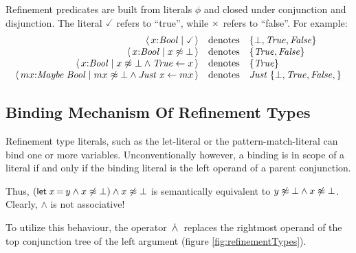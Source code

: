 Refinement predicates are built from literals $\phi$ and closed under conjunction and disjunction.
The literal $\true$ refers to ``true'', while $\times$ refers to ``false''. For example:
$$
	\begin{array}{rcl}
		\reft{ x{:}\ensuremath{\Conid{Bool}}}{ \true }                                                                                                           & \text{denotes} & \{ \bot, \ensuremath{\Conid{True}}, \ensuremath{\Conid{False}} \}                       \\
		\reft{ x{:}\ensuremath{\Conid{Bool}}}{ x \ntermeq \bot }                                                                                                 & \text{denotes} & \{ \ensuremath{\Conid{True}}, \ensuremath{\Conid{False}} \}                             \\
		\reft{ x{:}\ensuremath{\Conid{Bool}}}{ x \ntermeq \bot \wedge \ctcon{\ensuremath{\Conid{True}}}{x} }                                                     & \text{denotes} & \{ \ensuremath{\Conid{True}} \}                                                         \\
		\reft{ mx{:}\ensuremath{\Conid{Maybe}\;\Conid{Bool}}}{ mx \ntermeq \bot \wedge \ctcon{\ensuremath{\Conid{Just}\;\Varid{x}}}{mx}  } & \text{denotes} & \ensuremath{\Conid{Just}\;}\{ \ensuremath{\bot}, \ensuremath{\Conid{True}}, \ensuremath{\Conid{False}}, \} \\
	\end{array}
$$

\subsection{Binding Mechanism Of Refinement Types}\label{chap:bckgrndRefinementTypesBinding}

Refinement type literals, such as the let-literal or the pattern-match-literal can bind one or more variables.
Unconventionally however, a binding is in scope of a literal if and only if
the binding literal is the left operand of a parent conjunction.

Thus, $(\textsf{let}\;x\,\textsf{=}\,y \land x \not\approx \bot) \land x \not\approx \bot$ is semantically equivalent to $y \not\approx \bot \land x \not\approx \bot$.
Clearly, $\land$ is not associative!

To utilize this behaviour, the operator $\,\dot{\wedge}\,$ replaces the rightmost operand of the top conjunction tree of the left argument (figure \ref{fig:refinementTypes}).

